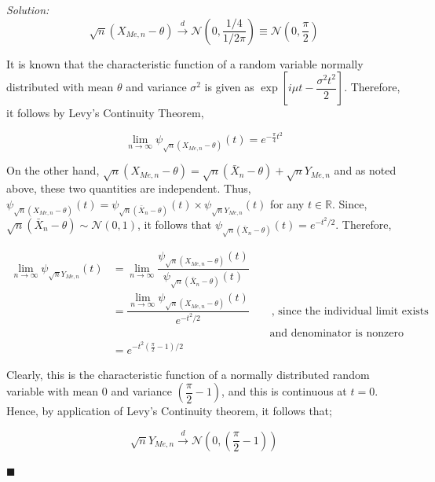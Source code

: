 \documentclass[12pt]{article}
\newcommand{\R}{\mathbb{R}}
\newcommand{\normal}{\mathcal{N}}
\theoremstyle{definition}
\newenvironment{answer}{\textit{Solution: }\quad }{ \hfill $\blacksquare$}
\numberwithin{equation}{section}
\begin{document}
\begin{answer}
    \begin{equation}
        \sqrt{n}(X_{Me, n} - \theta) \xrightarrow{d} \normal\left( 0, \dfrac{1/4}{1/2\pi} \right) \equiv \normal\left( 0, \dfrac{\pi}{2} \right)
        \label{eqn:8-1}
    \end{equation}

    It is known that the characteristic function of a random variable normally distributed with mean $\theta$ and variance $\sigma^2$ is given as $\exp\left[ i\mu t - \dfrac{\sigma^2t^2}{2} \right]$. Therefore, it follows by Levy's Continuity Theorem,
    
    \begin{equation}
        \lim_{n \rightarrow \infty} \psi_{\sqrt{n}(X_{Me, n} - \theta)}(t) = e^{-\frac{\pi}{4}t^2}
        \label{eqn:8-2}        
    \end{equation}

    On the other hand, $\sqrt{n}(X_{Me, n} - \theta) = \sqrt{n} (\bar{X}_n - \theta) + \sqrt{n}Y_{Me, n}$ and as noted above, these two quantities are independent. Thus, $\psi_{\sqrt{n}(X_{Me, n} - \theta)}(t) = \psi_{\sqrt{n}(\bar{X}_n - \theta)}(t) \times \psi_{\sqrt{n}Y_{Me, n}}(t)$ for any $t \in \R$. Since, $\sqrt{n} (\bar{X}_n - \theta) \sim \normal(0, 1)$, it follows that $\psi_{\sqrt{n}(\bar{X}_n - \theta)}(t) = e^{-t^2/2}$. Therefore,

    \begin{align*}
        \lim_{n \rightarrow \infty} \psi_{\sqrt{n}Y_{Me, n}}(t)
        & = \lim_{n \rightarrow \infty} \dfrac{\psi_{\sqrt{n}(X_{Me, n} - \theta)}(t) }{\psi_{\sqrt{n} (\bar{X}_n - \theta)}(t)}\\
        & = \dfrac{\lim_{n \rightarrow \infty}  \psi_{\sqrt{n}(X_{Me, n} - \theta)}(t) }{e^{-t^2/2}} \qquad \text{, since the individual limit exists}\\ 
        & \qquad \qquad \qquad \qquad \qquad \qquad \qquad \text{ and denominator is nonzero}\\
        & = e^{-t^2(\frac{\pi}{2} - 1)/2}
    \end{align*}

    Clearly, this is the characteristic function of a normally distributed random variable with mean $0$ and variance $\left( \dfrac{\pi}{2} - 1 \right)$, and this is continuous at $t = 0$. Hence, by application of Levy's Continuity theorem, it follows that;
    
    \begin{equation*}
        \sqrt{n}Y_{Me, n} \xrightarrow{d} \normal\left( 0, \left( \dfrac{\pi}{2} - 1 \right) \right)
    \end{equation*}


\end{answer}
\end{document}
